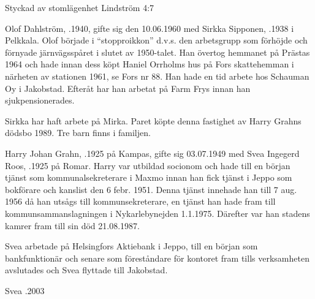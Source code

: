 Styckad av stomlägenhet Lindström 4:7


Olof Dahlström, .1940, gifte sig den 10.06.1960 med Sirkka Sipponen, .1938 i Pelkkala. Olof började i ``stopproikkon'' d.v.s. den arbetsgrupp som förhöjde och förnyade järnvägsspåret i slutet av 1950-talet. Han övertog hemmanet på Prästas 1964 och hade innan dess köpt Haniel Orrholms hus på Fors skattehemman i närheten av stationen 1961, se Fors nr 88. Han hade en tid arbete hos Schauman Oy i Jakobstad. Efteråt har han arbetat på Farm Frys innan han sjukpensionerades.

Sirkka har haft arbete på Mirka. Paret köpte denna fastighet av Harry Grahns dödsbo 1989. Tre barn finns i familjen.
\begin{jhchildren}
  \item {}
  \item {}
  \item {}
\end{jhchildren}


Harry Johan Grahn, .1925 på Kampas, gifte sig 03.07.1949 med Svea Ingegerd Roos, .1925 på Romar. Harry var utbildad socionom och hade till en början tjänst som kommunalsekreterare i Maxmo innan han fick tjänst i Jeppo som bokförare och kanslist den 6 febr. 1951. Denna tjänst innehade han till 7 aug. 1956 då han utsågs till kommunsekreterare, en tjänst han hade fram till kommunsammanslagningen i Nykarlebynejden 1.1.1975. Därefter var han stadens kamrer fram till sin död 21.08.1987.

Svea arbetade på Helsingfors Aktiebank i Jeppo, till en början som bankfunktionär och senare som föreståndare för kontoret fram tills verksamheten avslutades och Svea flyttade till Jakobstad.
\begin{jhchildren}
  \item {}
  \item {}
  \item {}
\end{jhchildren}
Svea .2003



